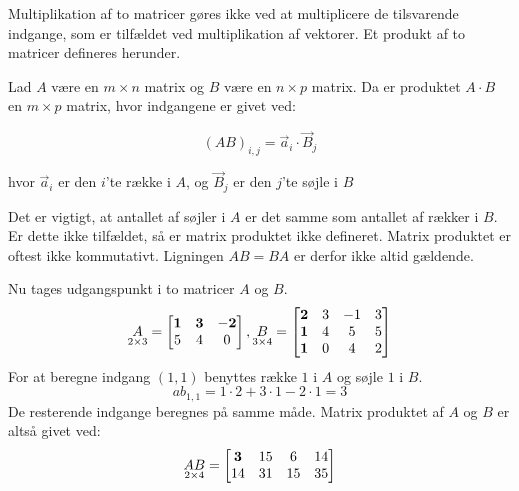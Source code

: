 Multiplikation af to matricer gøres ikke ved at multiplicere de tilsvarende indgange, som er tilfældet ved multiplikation af vektorer. Et produkt af to matricer defineres herunder. 
\begin{defn} 
Lad $A$ være en $m \times n$ matrix og $B$ være en $n \times p$ matrix. Da er produktet $A \cdot B$ en $m \times p$ matrix, hvor indgangene er givet ved: 

$$(AB)_{i,j} = \vec{a}_i \cdot \vec{B}_j$$

hvor $\vec{a}_i$ er den $i$'te række i $A$, og $\vec{B}_j$ er den $j$'te søjle i $B$
\label{def:(matrixprodukt)}
\end{defn}
Det er vigtigt, at antallet af søjler i $A$ er det samme som antallet af rækker i $B$. Er dette ikke tilfældet, så er matrix produktet ikke defineret. Matrix produktet er oftest ikke kommutativt. Ligningen $AB=BA$ er derfor ikke altid gældende. 
\begin{eks}
Nu tages udgangspunkt i to matricer $A$ og $B$. 
\begin{align*}
\underset{2 \times 3}{A}= \begin{bmatrix}
	\bf{1} & \bf{3} & \bf{-2} \\
	5 & 4 & 0 	
\end{bmatrix},
\underset{3 \times 4}{B}= \begin{bmatrix}
	\bf{2} & 3 & -1 & 3 \\
	\bf{1} & 4 & 5 & 5\\
	\bf{1} & 0 & 4 & 2
\end{bmatrix}  
\end{align*}
For at beregne indgang $(1,1)$ benyttes række $1$ i $A$ og søjle $1$ i $B$. 
$$ab_{1,1}=1\cdot 2+3\cdot 1-2 \cdot 1 = 3$$ 
De resterende indgange beregnes på samme måde. 
Matrix produktet af $A$ og $B$ er altså givet ved:
\begin{align*}
\underset{2 \times 4}{AB}= \begin{bmatrix}
	\bf{3} & 15 & 6 & 14 \\
	14 & 31 & 15 & 35
\end{bmatrix}  
\end{align*}
\end{eks}